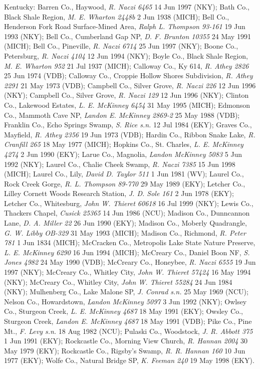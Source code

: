 \documentclass{article}
\begin{document}
Kentucky:
Barren Co., Haywood, \textit{R. Naczi 6465} 14 Jun 1997 (NKY);
Bath Co., Black Shale Region, \textit{M. E. Wharton 2448b} 2 Jun 1938 (MICH);
Bell Co., Henderson Fork Road Surface-Mined Area, \textit{Ralph L. Thompson 93-161} 19 Jun 1993 (NKY);
Bell Co., Cumberland Gap NP, \textit{D. F. Brunton 10355} 24 May 1991 (MICH);
Bell Co., Pineville, \textit{R. Naczi 6714} 25 Jun 1997 (NKY);
Boone Co., Petersburg, \textit{R. Naczi 4104} 12 Jun 1994 (NKY);
Boyle Co., Black Shale Region, \textit{M. E. Wharton 952} 21 Jul 1937 (MICH);
Calloway Co., Ky 614, \textit{R. Athey 2826} 25 Jun 1974 (VDB);
Calloway Co., Croppie Hollow Shores Subdivision, \textit{R. Athey 2291} 21 May 1973 (VDB);
Campbell Co., Silver Grove, \textit{R. Naczi 226} 12 Jun 1996 (NKY);
Campbell Co., Silver Grove, \textit{R. Naczi 129} 12 Jun 1996 (NKY);
Clinton Co., Lakewood Estates, \textit{L. E. McKinney 6454} 31 May 1995 (MICH);
Edmonson Co., Mammoth Cave NP, \textit{Landon E. McKinney 2869-2} 25 May 1988 (VDB);
Franklin Co., Echo Springs Swamp, \textit{S. Rice s.n.} 12 Jul 1984 (EKY);
Graves Co., Mayfield, \textit{R. Athey 2356} 19 Jun 1973 (VDB);
Hardin Co., Ribbon Snake Lake, \textit{R. Cranfill 265} 18 May 1977 (MICH);
Hopkins Co., St. Charles, \textit{L. E. McKinney 4274} 2 Jun 1990 (EKY);
Larue Co., Magnolia, \textit{Landon McKinney 5083} 5 Jun 1992 (NKY);
Laurel Co., Chalie Cheek Swamp, \textit{R. Naczi 7385} 15 Jun 1998 (MICH);
Laurel Co., Lily, \textit{David D. Taylor 511} 1 Jun 1981 (WV);
Laurel Co., Rock Creek Gorge, \textit{R. L. Thompson 89-770} 29 May 1989 (EKY);
Letcher Co., Lilley Cornett Woods Research Station, \textit{J. D. Sole 161} 2 Jun 1978 (EKY);
Letcher Co., Whitesburg, \textit{John W. Thieret 60618} 16 Jul 1999 (NKY);
Lewis Co., Thackers Chapel, \textit{Cusick 25365} 14 Jun 1986 (NCU);
Madison Co., Dunncannon Lane, \textit{D. A. Miller 22} 26 Jun 1990 (EKY);
Madison Co., Moberly Quadrangle, \textit{G. W. Libby OB-329} 31 May 1993 (MICH);
Madison Co., Richmond, \textit{R. Peter 781} 1 Jun 1834 (MICH);
McCracken Co., Metropolis Lake State Nature Preserve, \textit{L. E. McKinney 6290} 16 Jun 1994 (MICH);
McCreary Co., Daniel Boon NF, \textit{S. Jones 4982} 24 May 1990 (VDB);
McCreary Co., Honeybee, \textit{R. Naczi 6555} 19 Jun 1997 (NKY);
McCreary Co., Whitley City, \textit{John W. Thieret 57424} 16 May 1994 (NKY);
McCreary Co., Whitley City, \textit{John W. Thieret 55284} 24 Jun 1984 (NKY);
Mulhenberg Co., Lake Malone SP, \textit{J. Conrad s.n.} 25 May 1969 (NCU);
Nelson Co., Howardstown, \textit{Landon McKinney 5097} 3 Jun 1992 (NKY);
Owlsey Co., Sturgeon Creek, \textit{L. E. McKinney 4687} 18 May 1991 (EKY);
Owsley Co., Sturgeon Creek, \textit{Landon E. McKinney 4687} 18 May 1991 (VDB);
Pike Co., Pine Mt., \textit{F. Levy s.n.} 18 Aug 1982 (NCU);
Pulaski Co., Woodstock, \textit{J. R. Abbott 375} 1 Jun 1991 (EKY);
Rockcastle Co., Morning View Church, \textit{R. Hannan 2004} 30 May 1979 (EKY);
Rockcastle Co., Rigsby's Swamp, \textit{R. R. Hannan 160} 10 Jun 1977 (EKY);
Wolfe Co., Natural Bridge SP, \textit{K. Feeman 240} 19 May 1998 (EKY).
\end{document}
